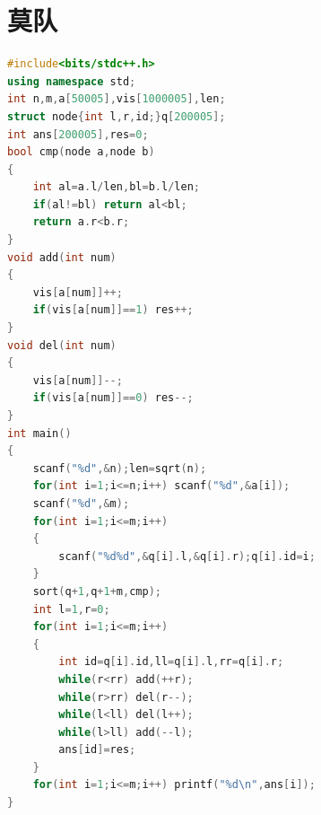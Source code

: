 \documentclass[a4paper]{book}
\begin{document}
\section{莫队}
\begin{lstlisting}[language=c++,title=区间不同种类元素个数]
#include<bits/stdc++.h> 
using namespace std;
int n,m,a[50005],vis[1000005],len;
struct node{int l,r,id;}q[200005];
int ans[200005],res=0;
bool cmp(node a,node b)
{
	int al=a.l/len,bl=b.l/len;
	if(al!=bl) return al<bl;
	return a.r<b.r;
}
void add(int num)
{
	vis[a[num]]++;
	if(vis[a[num]]==1) res++;
}
void del(int num)
{
	vis[a[num]]--;
	if(vis[a[num]]==0) res--;
} 
int main()
{
	scanf("%d",&n);len=sqrt(n);
	for(int i=1;i<=n;i++) scanf("%d",&a[i]);
	scanf("%d",&m);
	for(int i=1;i<=m;i++)
	{
		scanf("%d%d",&q[i].l,&q[i].r);q[i].id=i;
	}
	sort(q+1,q+1+m,cmp);
	int l=1,r=0;
	for(int i=1;i<=m;i++)
	{
		int id=q[i].id,ll=q[i].l,rr=q[i].r;
		while(r<rr) add(++r);
		while(r>rr) del(r--);
		while(l<ll) del(l++);
		while(l>ll) add(--l);
		ans[id]=res;
	}
	for(int i=1;i<=m;i++) printf("%d\n",ans[i]);
}
\end{lstlisting}
\ifx\allfiles\undefined
\end{document}
